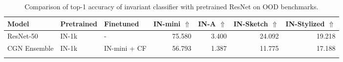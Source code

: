 
\begin{table}[H]
\centering
\scriptsize
\captionsetup{font=footnotesize,skip=1mm}
\caption{Comparison of top-1 accuracy of invariant classifier with pretrained ResNet on OOD benchmarks.}
\label{tab:ood}
\begin{tabular}{@{}lllrrrr@{}}
\toprule
\textbf{Model} & \textbf{Pretrained} & \textbf{Finetuned} & \textbf{IN-mini} $\Uparrow$ & \textbf{IN-A} $\Uparrow$ & \textbf{IN-Sketch} $\Uparrow$ & \textbf{IN-Stylized} $\Uparrow$ \\ \midrule
ResNet-50 & IN-1k & - & 75.580 & 3.400 & 24.092 &  19.218               \\
CGN Ensemble & IN-1k & IN-mini + CF & 56.793 & 1.387 & 11.775 &  17.188                \\
\arrayrulecolor{black}\bottomrule
\end{tabular}
\end{table}
